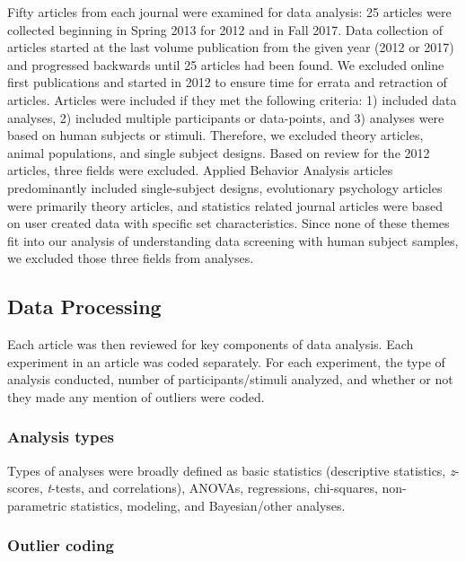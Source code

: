 \documentclass[english,man]{apa6}
\theoremstyle{definition}
\theoremstyle{definition}
\theoremstyle{definition}
\theoremstyle{remark}
\begin{document}
Fifty articles from each journal were examined for data analysis: 25
articles were collected beginning in Spring 2013 for 2012 and in Fall
2017. Data collection of articles started at the last volume publication
from the given year (2012 or 2017) and progressed backwards until 25
articles had been found. We excluded online first publications and
started in 2012 to ensure time for errata and retraction of articles.
Articles were included if they met the following criteria: 1) included
data analyses, 2) included multiple participants or data-points, and 3)
analyses were based on human subjects or stimuli. Therefore, we excluded
theory articles, animal populations, and single subject designs. Based
on review for the 2012 articles, three fields were excluded. Applied
Behavior Analysis articles predominantly included single-subject
designs, evolutionary psychology articles were primarily theory
articles, and statistics related journal articles were based on user
created data with specific set characteristics. Since none of these
themes fit into our analysis of understanding data screening with human
subject samples, we excluded those three fields from analyses.

\subsection{Data Processing}\label{data-processing}

Each article was then reviewed for key components of data analysis. Each
experiment in an article was coded separately. For each experiment, the
type of analysis conducted, number of participants/stimuli analyzed, and
whether or not they made any mention of outliers were coded.

\subsubsection{Analysis types}\label{analysis-types}

Types of analyses were broadly defined as basic statistics (descriptive
statistics, \emph{z}-scores, \emph{t}-tests, and correlations), ANOVAs,
regressions, chi-squares, non-parametric statistics, modeling, and
Bayesian/other analyses.

\subsubsection{Outlier coding}\label{outlier-coding}
\end{document}
